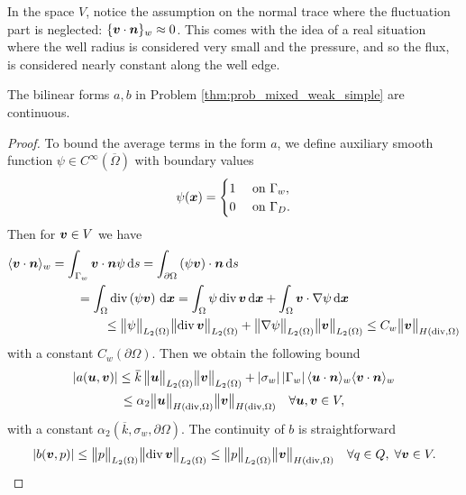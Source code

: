 In the space $V$, notice the assumption on the normal trace where the fluctuation part is neglected: $\{\mathbf{\boldsymbol{v}}\cdot \mathbf{\boldsymbol{n}}\}_w \approx 0$.
This comes with the idea of a real situation where the well radius is considered very small and the pressure, and so the flux,
is considered nearly constant along the well edge.

\begin{lemma} \label{lem:mixed_continuity_ab}
The bilinear forms $a,b$ in Problem \ref{thm:prob_mixed_weak_simple} are continuous.
\end{lemma}
\begin{proof}
To bound the average terms in the form $a$,
we define auxiliary smooth function $\psi\in C^{\infty}(\overbar\Omega)$ with boundary values
\begin{equation}
  \psi(\mathbf{\boldsymbol{x}}) =
  \begin{cases}
    1 & \textrm{ on } \Gamma_w, \\
    0 & \textrm{ on } \Gamma_D.
  \end{cases}
\end{equation}
Then for $\mathbf{\boldsymbol{v}}\in V$ we have
\begin{align}
  \langle\mathbf{\boldsymbol{v}} \cdot\mathbf{\boldsymbol{n}}\rangle_w = \int_{\Gamma_w} \mathbf{\boldsymbol{v}} \cdot\mathbf{\boldsymbol{n}} \psi \,{\rm d} s = 
    \int_{\partial\Omega} \left( \psi \mathbf{\boldsymbol{v}} \right) \cdot\mathbf{\boldsymbol{n}} \,{\rm d} s & \nonumber\\
    = \int_{\Omega} {\rm div}\left( \psi \mathbf{\boldsymbol{v}} \right) \,{\rm d}\mathbf{\boldsymbol{x}}
    = \int_{\Omega} \psi\, {\rm div}\, &\mathbf{\boldsymbol{v}} \,{\rm d}\mathbf{\boldsymbol{x}} + \int_{\Omega} \mathbf{\boldsymbol{v}} \cdot \nabla\psi \,{\rm d}\mathbf{\boldsymbol{x}} \nonumber\\
    \leq \bigl\Vert\psi\bigr\Vert_{L_2(\Omega)} \bigl\Vert{\rm div}\,\mathbf{\boldsymbol{v}}\bigr\Vert_{L_2(\Omega)}& + \bigl\Vert\nabla\psi\bigr\Vert_{L_2(\Omega)} \bigl\Vert\mathbf{\boldsymbol{v}}\bigr\Vert_{L_2(\Omega)}
    \leq C_w \bigl\Vert\mathbf{\boldsymbol{v}}\bigr\Vert_{H({\rm div},\Omega)}
\end{align}
with a constant $C_w(\partial\Omega)$. Then we obtain the following bound
\begin{multline} \label{eqn:form_a_bound}
    \abs{a(\vc u,\vc v)} \leq \overbar{k}\, \norm{\vc u}_{L_2(\Omega)} \norm{\vc v}_{L_2(\Omega)}
        + \abs{\sigma_w} \abs{\Gamma_w} \avg{\vc u\cdot\vc n}_w \avg{\vc v\cdot\vc n}_w\\
        \leq \alpha_2 \norm{\vc u}_{H(\div,\Omega)} \norm{\vc v}_{H(\div,\Omega)} \quad \forall \vc u,\vc v\in V,
\end{multline}
with a constant $\alpha_2 \left(\overbar{k}, \sigma_w, \partial\Omega\right)$.
The continuity of $b$ is straightforward
\begin{equation} \label{eqn:form_b_bound}
    \left|b(\mathbf{\boldsymbol{v}},p)\right| \leq \bigl\Vert p\bigr\Vert_{L_2(\Omega)} \bigl\Vert{\rm div}\,\mathbf{\boldsymbol{v}}\bigr\Vert_{L_2(\Omega)}
        \leq \bigl\Vert p\bigr\Vert_{L_2(\Omega)} \bigl\Vert\mathbf{\boldsymbol{v}}\bigr\Vert_{H({\rm div},\Omega)} \quad \forall q\in Q,\;\forall \mathbf{\boldsymbol{v}}\in V.
\end{equation}
\end{proof}

